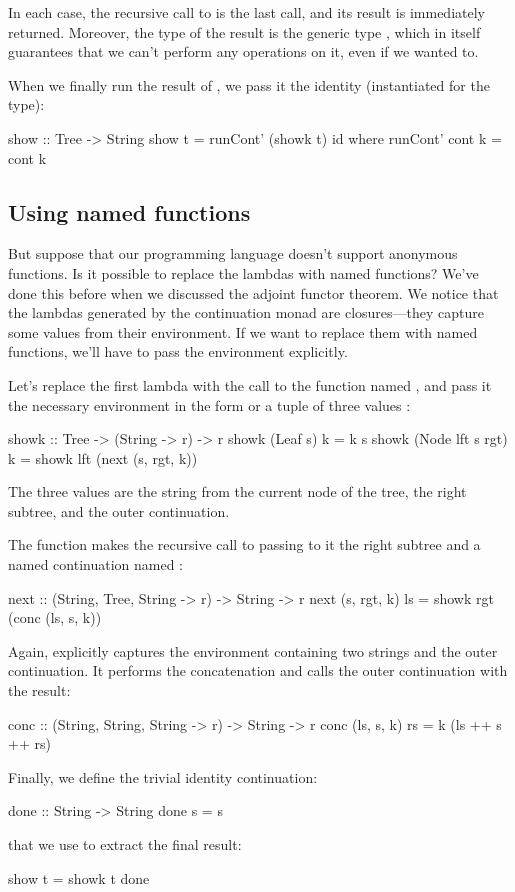 \documentclass[DaoFP]{subfiles}
\begin{document}
In each case, the recursive call to  is the last call, and its result is immediately returned. Moreover, the type of the result is the generic type , which in itself guarantees that we can't perform any operations on it, even if we wanted to. 

When we finally run the result of , we pass it the identity (instantiated for the  type):
\begin{haskell}
show :: Tree -> String
show t = runCont' (showk t) id
  where runCont' cont k = cont k
\end{haskell}

\subsection{Using named functions}

But suppose that our programming language doesn't support anonymous functions. Is it possible to replace the lambdas with named functions? We've done this before when we discussed the adjoint functor theorem. We notice that the lambdas generated by the continuation monad are closures---they capture some values from their environment. If we want to replace them with named functions, we'll have to pass the environment explicitly. 

Let's replace the first lambda with the call to the function named , and pass it the necessary environment in the form or a tuple of three values :
\begin{haskell}
showk :: Tree -> (String -> r) -> r
showk (Leaf s) k = k s
showk (Node lft s rgt) k =
  showk lft (next (s, rgt, k))
\end{haskell}
The three values are the string from the current node of the tree, the right subtree, and the outer continuation. 

The function  makes the recursive call to  passing to it the right subtree and a named continuation named :
\begin{haskell}
next :: (String, Tree, String -> r) -> String -> r
next (s, rgt, k) ls = showk rgt (conc (ls, s, k))
\end{haskell}
Again,  explicitly captures the environment containing two strings and the outer continuation. It performs the concatenation and calls the outer continuation with the result:
\begin{haskell}
conc :: (String, String, String -> r) -> String -> r
conc (ls, s, k) rs = k (ls ++ s ++ rs)
\end{haskell}
Finally, we define the trivial identity continuation:
\begin{haskell}
done :: String -> String
done s = s
\end{haskell}
that we use to extract the final result:
\begin{haskell}
show t = showk t done
\end{haskell}
\end{document}
